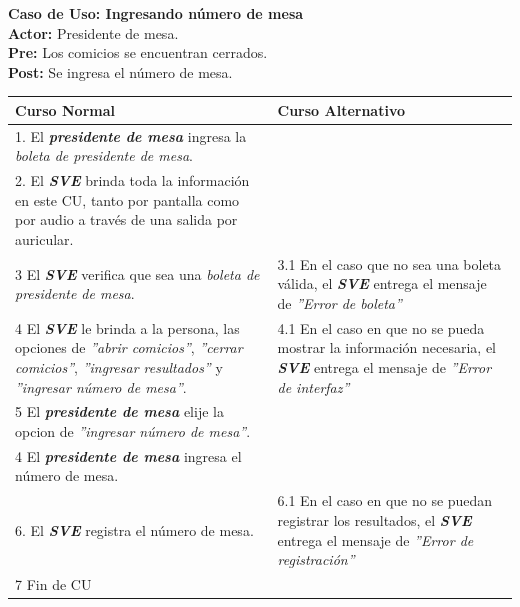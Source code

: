 \documentclass[spanish, 10pt,a4paper]{article}
\numberwithin{equation}{section} %
\begin{document}
\noindent\textbf{Caso de Uso: Ingresando número de mesa}\\
\textbf{Actor: } Presidente de mesa.\\
\textbf{Pre: } Los comicios se encuentran cerrados.\\
\textbf{Post: } Se ingresa el número de mesa.\\
\begin{table}[H]
  \centering
\bgroup
\def\arraystretch{1.3}
  \begin{tabular}{p{9cm} | p{7cm}}
    \hline
    Curso Normal & Curso Alternativo \\
    \hline
    \hline    
    1. El \textbf{\textit{presidente de mesa}} ingresa la \textit{boleta de presidente de mesa}. 
    & \\
    
    \hline
    2. El \textbf{\textit{SVE}} brinda toda la información en este CU, tanto por pantalla como por audio a través de una salida por auricular.
    &
    \\
    
    \hline
    3 El \textbf{\textit{SVE}} verifica que sea una \textit{boleta de presidente de mesa}.
    & 
    3.1 En el caso que no sea una boleta válida, el \textbf{\textit{SVE}} entrega el mensaje de \textit{''Error de boleta''}
    \\
    
    \hline
    4 El \textbf{\textit{SVE}} le brinda a la persona, las opciones de \textit{''abrir comicios''}, \textit{''cerrar comicios''}, \textit{''ingresar resultados''} y \textit{''ingresar número de mesa''}.
    & 
    4.1 En el caso en que no se pueda mostrar la información necesaria, el \textbf{\textit{SVE}} entrega el mensaje de \textit{''Error de interfaz''}
    \\
    
    \hline
    5 El \textbf{\textit{presidente de mesa}} elije la opcion de \textit{''ingresar número de mesa''}.
    & \\
    
    \hline
    4 El \textbf{\textit{presidente de mesa}} ingresa el número de mesa.
    \\
    
    \hline
    6. El \textbf{\textit{SVE}} registra el número de mesa.
    &
    6.1 En el caso en que no se puedan registrar los resultados, el \textbf{\textit{SVE}} entrega el mensaje de \textit{''Error de registración''}
    \\
    
    \hline
    7 Fin de CU
    & \\
    \hline
  \end{tabular}
\egroup
\end{table}
\end{document}
